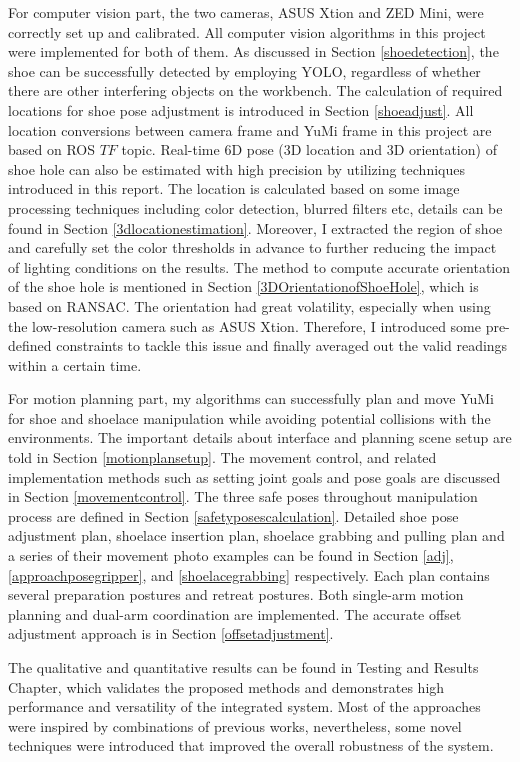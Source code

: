 For computer vision part, the two cameras, ASUS Xtion and ZED Mini, were correctly set up and calibrated. All computer vision algorithms in this project were implemented for both of them. As discussed in Section \ref{shoedetection}, the shoe can be successfully detected by employing YOLO, regardless of whether there are other interfering objects on the workbench. The calculation of required locations for shoe pose adjustment is introduced in Section \ref{shoeadjust}. All location conversions between camera frame and YuMi frame in this project are based on ROS $TF$ topic. Real-time 6D pose (3D location and 3D orientation) of shoe hole can also be estimated with high precision by utilizing techniques introduced in this report. The location is calculated based on some image processing techniques including color detection, blurred filters etc, details can be found in Section \ref{3dlocationestimation}. Moreover, I extracted the region of shoe and carefully set the color thresholds in advance to further reducing the impact of lighting conditions on the results. The method to compute accurate orientation of the shoe hole is mentioned in Section \ref{3DOrientationofShoeHole}, which is based on RANSAC. The orientation had great volatility, especially when using the low-resolution camera such as ASUS Xtion. Therefore, I introduced some pre-defined constraints to tackle this issue and finally averaged out the valid readings within a certain time.

For motion planning part, my algorithms can successfully plan and move YuMi for shoe and shoelace manipulation while avoiding potential collisions with the environments. The important details about interface and planning scene setup are told in Section \ref{motionplansetup}. The movement control, and related implementation methods such as setting joint goals and pose goals are discussed in Section \ref{movementcontrol}. The three safe poses throughout manipulation process are defined in Section \ref{safetyposescalculation}. Detailed shoe pose adjustment plan, shoelace insertion plan, shoelace grabbing and pulling plan and a series of their movement photo examples can be found in Section \ref{adj}, \ref{approachposegripper}, and \ref{shoelacegrabbing} respectively. Each plan contains several preparation postures and retreat postures. Both single-arm motion planning and dual-arm coordination are implemented. The accurate offset adjustment approach is in Section \ref{offsetadjustment}.

The qualitative and quantitative results can be found in Testing and Results Chapter, which validates the proposed methods and demonstrates high performance and versatility of the integrated system. Most of the approaches were inspired by combinations of previous works, nevertheless, some novel techniques were introduced that improved the overall robustness of the system.

